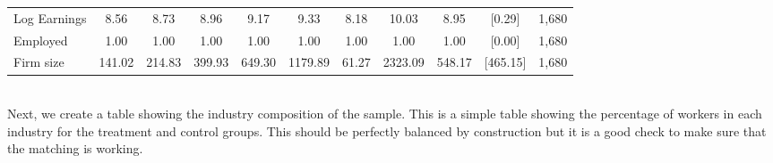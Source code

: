 \documentclass{article}
\begin{document}
\begin{table}[htbp]
\begin{threeparttable}
\begin{tabular}{lllllllllll}
\multicolumn{1}{l}{Log Earnings} &
  \multicolumn{1}{c}{8.56} &
  \multicolumn{1}{c}{8.73} &
  \multicolumn{1}{c}{8.96} &
  \multicolumn{1}{c}{9.17} &
  \multicolumn{1}{c}{9.33} &
  \multicolumn{1}{c}{8.18} &
  \multicolumn{1}{c}{10.03} &
  \multicolumn{1}{c}{8.95} &
  \multicolumn{1}{c}{[0.29]} &
  \multicolumn{1}{c}{1,680} \\
\multicolumn{1}{l}{Employed} &
  \multicolumn{1}{c}{1.00} &
  \multicolumn{1}{c}{1.00} &
  \multicolumn{1}{c}{1.00} &
  \multicolumn{1}{c}{1.00} &
  \multicolumn{1}{c}{1.00} &
  \multicolumn{1}{c}{1.00} &
  \multicolumn{1}{c}{1.00} &
  \multicolumn{1}{c}{1.00} &
  \multicolumn{1}{c}{[0.00]} &
  \multicolumn{1}{c}{1,680} \\
\multicolumn{1}{l}{Firm size} &
  \multicolumn{1}{c}{141.02} &
  \multicolumn{1}{c}{214.83} &
  \multicolumn{1}{c}{399.93} &
  \multicolumn{1}{c}{649.30} &
  \multicolumn{1}{c}{1179.89} &
  \multicolumn{1}{c}{61.27} &
  \multicolumn{1}{c}{2323.09} &
  \multicolumn{1}{c}{548.17} &
  \multicolumn{1}{c}{[465.15]} &
  \multicolumn{1}{c}{1,680} \\
\bottomrule
\end{tabular}

\end{threeparttable} 
\end{table}
\\ Next, we create a table showing the industry composition of the sample.
This is a simple table showing the percentage of workers in each industry for the treatment and control groups.
This should be perfectly balanced by construction but it is a good check to make sure that the matching is working.
\end{document}
